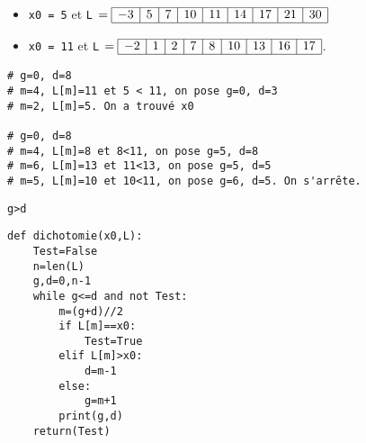 
\fi

\begin{itemize} 
\item  \lstinline{x0 = 5} et \lstinline{L} $= \begin{array}{|c|c|c|c|c|c|c|c|c|} 
\hline -3 & 5 & 7 & 10 & 11 & 14 & 17 & 21 & 30 \\ \hline
\end{array}$
\item \lstinline{x0 = 11} et \lstinline{L} $= \begin{array}{|c|c|c|c|c|c|c|c|c|} 
\hline -2 & 1 & 2 & 7 & 8 & 10 & 13 & 16 & 17  \\ \hline
\end{array}$.
\end{itemize}
\ifprof
\begin{corrige}
\begin{lstlisting}
# g=0, d=8
# m=4, L[m]=11 et 5 < 11, on pose g=0, d=3
# m=2, L[m]=5. On a trouvé x0

# g=0, d=8
# m=4, L[m]=8 et 8<11, on pose g=5, d=8
# m=6, L[m]=13 et 11<13, on pose g=5, d=5
# m=5, L[m]=10 et 10<11, on pose g=6, d=5. On s'arrête.
\end{lstlisting}
\end{corrige}
\else
\fi

\ifprof
\begin{corrige}
\begin{lstlisting}
g>d
\end{lstlisting}
\end{corrige}
\else
\fi

\ifprof
\begin{corrige}
\begin{lstlisting}
def dichotomie(x0,L):
    Test=False
    n=len(L)
    g,d=0,n-1
    while g<=d and not Test:
        m=(g+d)//2
        if L[m]==x0:
            Test=True
        elif L[m]>x0:
            d=m-1
        else:
            g=m+1
        print(g,d)
    return(Test)
\end{lstlisting}
\end{corrige}
\else
\fi



